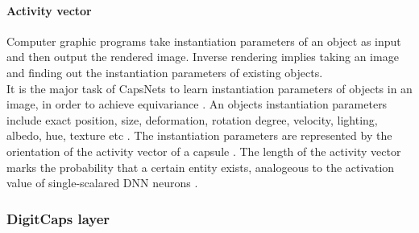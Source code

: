 \documentclass{article}
\begin{document}
{\paragraph{Activity vector}

Computer graphic programs take instantiation parameters of an object as input and then output the rendered image. Inverse rendering implies taking an image and finding out the instantiation parameters of existing objects.\\
It is the major task of CapsNets to learn instantiation parameters of objects in an image, in order to achieve equivariance \cite{Image_to_Capsules1}. An objects instantiation parameters include exact position, size, deformation, rotation degree, velocity, lighting, albedo, hue, texture etc \cite{Image_to_Capsules1}.
The instantiation parameters are represented by the orientation of the activity vector of a capsule \cite{hinton17}. The length of the activity vector marks the probability that a certain entity exists, analogeous to the activation value of single-scalared DNN neurons \cite{hinton17}.

\subsubsection{DigitCaps layer}

}
\end{document}
